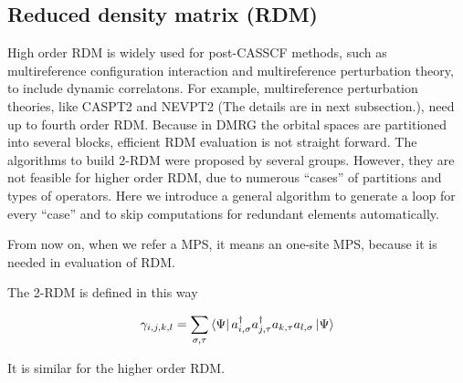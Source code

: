 \subsection{Reduced density matrix (RDM)}

High order RDM is widely used for post-CASSCF methods, such as multireference configuration interaction\cite{buenker_individualized_1974} and multireference perturbation theory\cite{andersson_second-order_1990, angeli_n-electron_2002}, to include dynamic correlatons. For example, multireference perturbation theories, like CASPT2\cite{andersson_second-order_1990} and NEVPT2\cite{angeli_n-electron_2002} (The details are in next subsection.), need up to fourth order RDM. 
Because in DMRG the orbital spaces are partitioned into several blocks, efficient RDM evaluation is not straight forward. The algorithms to build 2-RDM were proposed by several groups.\cite{ghosh_orbital_2008,zgid_obtaining_2008} However, they are not feasible for higher order RDM, due to numerous ``cases'' of partitions and types of operators. Here we introduce a general algorithm to generate a loop for every ``case'' and to skip computations for redundant elements automatically.

From now on, when we refer a MPS, it means an one-site MPS, because it is needed in evaluation of RDM.

The 2-RDM is defined in this way

\begin{equation}
\gamma_{i,j,k,l}=\sum_{\sigma,\tau} \bra{\Psi}a^\dagger_{i,\sigma}a^\dagger_{j,\tau}a_{k,\tau}a_{l,\sigma}\ket{\Psi}
\end{equation}

It is similar for the higher order RDM.

%
%


